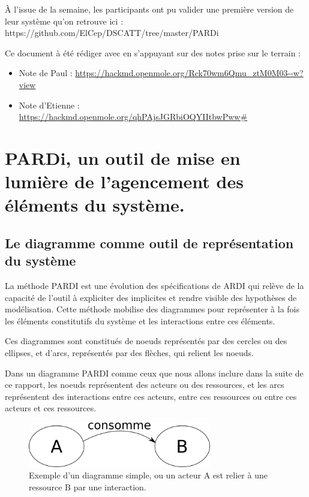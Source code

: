 À l'issue de la semaine, les participants ont pu valider une première version de leur système qu'on retrouve ici : https://github.com/ElCep/DSCATT/tree/master/PARDi

Ce document à été rédiger avec en s'appuyant sur des notes prise sur le terrain :
\begin{itemize}
  \item Note de Paul : \url{https://hackmd.openmole.org/Rck70wm6Qmu_ztM0M03--w?view}
  \item Note d'Etienne : \url{https://hackmd.openmole.org/qhPAjsJGRbiOQYIItbwPww#}
\end{itemize}


\section{PARDi, un outil de mise en lumière de l'agencement des éléments du système.}

\subsection{Le diagramme comme outil de représentation du système}

La méthode PARDI est une évolution des spécifications de ARDI\cite{etienne_ardi_2011} qui relève de la capacité de l'outil à expliciter des implicites et rendre visible des  hypothèses de modélisation. Cette méthode mobilise des diagrammes pour représenter à la fois les éléments constitutifs du système et les interactions entre ces éléments.

Ces diagrammes sont constitués de noeuds représentés par des cercles ou des ellipses, et d'arcs, représentés par des flèches, qui relient les noeuds.

Dans un diagramme PARDI comme ceux que nous allons inclure dans la suite de ce rapport, les noeuds représentent des acteurs ou des ressources, et les arcs représentent des interactions entre ces acteurs, entre ces ressources ou entre ces acteurs et ces ressources.

\begin{figure}
  \begin{center}
    \includegraphics[width=8cm]{img/diagramme_simple.png}
  \end{center}
  \caption{Exemple d'un diagramme simple, ou un acteur A est relier à une ressource B par une interaction.}
  \label{simple_interac}
\end{figure}

